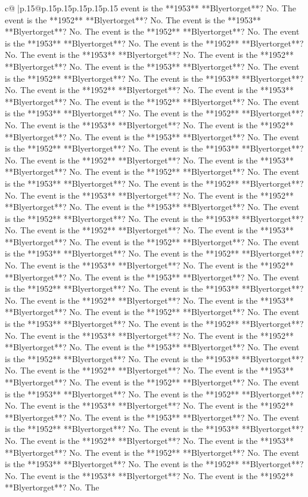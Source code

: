 \documentclass{article}
\begin{document}
{\begin{supertabular}{c@{$\;$}|p{.15\linewidth}@{}p{.15\linewidth}p{.15\linewidth}p{.15\linewidth}p{.15\linewidth}p{.15\linewidth}}
{{{event is the **1953** **Blyertorget**? No. The event is the **1952** **Blyertorget**? No. The event is the **1953** **Blyertorget**? No. The event is the **1952** **Blyertorget**? No. The event is the **1953** **Blyertorget**? No. The event is the **1952** **Blyertorget**? No. The event is the **1953** **Blyertorget**? No. The event is the **1952** **Blyertorget**? No. The event is the **1953** **Blyertorget**? No. The event is the **1952** **Blyertorget**? No. The event is the **1953** **Blyertorget**? No. The event is the **1952** **Blyertorget**? No. The event is the **1953** **Blyertorget**? No. The event is the **1952** **Blyertorget**? No. The event is the **1953** **Blyertorget**? No. The event is the **1952** **Blyertorget**? No. The event is the **1953** **Blyertorget**? No. The event is the **1952** **Blyertorget**? No. The event is the **1953** **Blyertorget**? No. The event is the **1952** **Blyertorget**? No. The event is the **1953** **Blyertorget**? No. The event is the **1952** **Blyertorget**? No. The event is the **1953** **Blyertorget**? No. The event is the **1952** **Blyertorget**? No. The event is the **1953** **Blyertorget**? No. The event is the **1952** **Blyertorget**? No. The event is the **1953** **Blyertorget**? No. The event is the **1952** **Blyertorget**? No. The event is the **1953** **Blyertorget**? No. The event is the **1952** **Blyertorget**? No. The event is the **1953** **Blyertorget**? No. The event is the **1952** **Blyertorget**? No. The event is the **1953** **Blyertorget**? No. The event is the **1952** **Blyertorget**? No. The event is the **1953** **Blyertorget**? No. The event is the **1952** **Blyertorget**? No. The event is the **1953** **Blyertorget**? No. The event is the **1952** **Blyertorget**? No. The event is the **1953** **Blyertorget**? No. The event is the **1952** **Blyertorget**? No. The event is the **1953** **Blyertorget**? No. The event is the **1952** **Blyertorget**? No. The event is the **1953** **Blyertorget**? No. The event is the **1952** **Blyertorget**? No. The event is the **1953** **Blyertorget**? No. The event is the **1952** **Blyertorget**? No. The event is the **1953** **Blyertorget**? No. The event is the **1952** **Blyertorget**? No. The event is the **1953** **Blyertorget**? No. The event is the **1952** **Blyertorget**? No. The event is the **1953** **Blyertorget**? No. The event is the **1952** **Blyertorget**? No. The event is the **1953** **Blyertorget**? No. The event is the **1952** **Blyertorget**? No. The event is the **1953** **Blyertorget**? No. The event is the **1952** **Blyertorget**? No. The event is the **1953** **Blyertorget**? No. The event is the **1952** **Blyertorget**? No. The event is the **1953** **Blyertorget**? No. The event is the **1952** **Blyertorget**? No. The event is the **1953** **Blyertorget**? No. The event is the **1952** **Blyertorget**? No. The event is the **1953** **Blyertorget**? No. The event is the **1952** **Blyertorget**? No. The event is the **1953** **Blyertorget**? No. The event is the **1952** **Blyertorget**? No. The event is the **1953** **Blyertorget**? No. The event is the **1952** **Blyertorget**? No. The }}}
\end{supertabular}}
\end{document}
